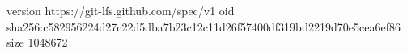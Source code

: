 version https://git-lfs.github.com/spec/v1
oid sha256:c582956224d27c22d5dba7b23c12c11d26f57400df319bd2219d70e5cea6ef86
size 1048672

